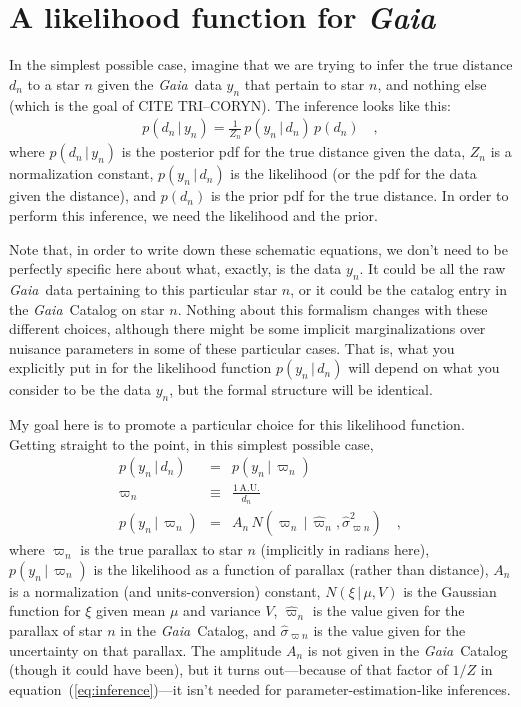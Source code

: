 \documentclass[12pt, modern]{aastex62}
\newcommand{\Gaia}{\textsl{Gaia}}
\newcommand{\equationname}{equation}
\newcommand{\AU}{\mathrm{A.U.}}
\newcommand{\given}{\,|\,}
\begin{document}
\section{A likelihood function for \Gaia}
In the simplest possible case, imagine that we are trying to infer
the true distance $d_n$ to a star $n$ given the \Gaia\ data $y_n$ that
pertain to star $n$, and nothing else
(which is the goal of CITE TRI--CORYN).
The inference looks like this:
\begin{eqnarray}
p(d_n\given y_n) = \frac{1}{Z_n}\,p(y_n\given d_n)\,p(d_n)
\label{eq:inference}
\quad ,
\end{eqnarray}
where
$p(d_n\given y_n)$ is the posterior pdf for the true distance given the data,
$Z_n$ is a normalization constant,
$p(y_n\given d_n)$ is the likelihood (or the pdf for the data given the distance),
and $p(d_n)$ is the prior pdf for the true distance.
In order to perform this inference, we need the likelihood and the prior.

Note that, in order to write down these schematic equations,
we don't need to be perfectly specific here about what, exactly,
is the data $y_n$.
It could be all the raw \Gaia\ data pertaining to this particular star $n$,
or it could be the catalog entry in the \Gaia\ Catalog on star $n$.
Nothing about this formalism changes with these different choices,
although there might be some implicit marginalizations over nuisance
parameters in some of these particular cases.
That is, what you explicitly put in for the likelihood function $p(y_n\given d_n)$
will depend on what you consider to be the data $y_n$, but the formal structure
will be identical.

My goal here is to promote a particular choice for this likelihood function.
Getting straight to the point, in this simplest possible case, 
\begin{eqnarray}
p(y_n\given d_n) &=& p(y_n\given\varpi_n)
\label{eq:gotoparallax}
\\
\varpi_n &\equiv& \frac{1\,\AU}{d_n}
\\
p(y_n\given\varpi_n) &=& A_n\,N(\varpi_n\given\hat{\varpi}_n,\hat{\sigma}^2_{\varpi n})
\label{eq:onedlike}
\quad ,
\end{eqnarray}
where
$\varpi_n$ is the true parallax to star $n$ (implicitly in radians here),
$p(y_n\given\varpi_n)$ is the likelihood as a function of parallax (rather than distance),
$A_n$ is a normalization (and units-conversion) constant,
$N(\xi\given\mu,V)$ is the Gaussian function for $\xi$ given mean $\mu$ and variance $V$,
$\hat{\varpi}_n$ is the value given for the parallax of star $n$ in the \Gaia\ Catalog,
and $\hat{\sigma}_{\varpi n}$ is the value given for the uncertainty on that parallax.
The amplitude $A_n$ is not given in the \Gaia\ Catalog (though it could have been),
but it turns out---because of that factor of $1/Z$ in
\equationname~(\ref{eq:inference})---it isn't needed for parameter-estimation-like
inferences.
\end{document}
